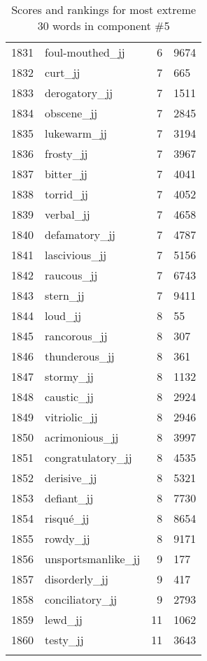 \begin{longtable}[!htbp]{| rlr@{.}l |}
    1831 & foul-mouthed\_jj & 6 & 9674 \\
    1832 & curt\_jj & 7 & 665 \\
    1833 & derogatory\_jj & 7 & 1511 \\
    1834 & obscene\_jj & 7 & 2845 \\
    1835 & lukewarm\_jj & 7 & 3194 \\
    1836 & frosty\_jj & 7 & 3967 \\
    1837 & bitter\_jj & 7 & 4041 \\
    1838 & torrid\_jj & 7 & 4052 \\
    1839 & verbal\_jj & 7 & 4658 \\
    1840 & defamatory\_jj & 7 & 4787 \\
    1841 & lascivious\_jj & 7 & 5156 \\
    1842 & raucous\_jj & 7 & 6743 \\
    1843 & stern\_jj & 7 & 9411 \\
    1844 & loud\_jj & 8 & 55 \\
    1845 & rancorous\_jj & 8 & 307 \\
    1846 & thunderous\_jj & 8 & 361 \\
    1847 & stormy\_jj & 8 & 1132 \\
    1848 & caustic\_jj & 8 & 2924 \\
    1849 & vitriolic\_jj & 8 & 2946 \\
    1850 & acrimonious\_jj & 8 & 3997 \\
    1851 & congratulatory\_jj & 8 & 4535 \\
    1852 & derisive\_jj & 8 & 5321 \\
    1853 & defiant\_jj & 8 & 7730 \\
    1854 & risqué\_jj & 8 & 8654 \\
    1855 & rowdy\_jj & 8 & 9171 \\
    1856 & unsportsmanlike\_jj & 9 & 177 \\
    1857 & disorderly\_jj & 9 & 417 \\
    1858 & conciliatory\_jj & 9 & 2793 \\
    1859 & lewd\_jj & 11 & 1062 \\
    1860 & testy\_jj & 11 & 3643 \\
    \hline
    \caption{Scores and rankings for most extreme 30 words in component \#5} \\
\end{longtable}
